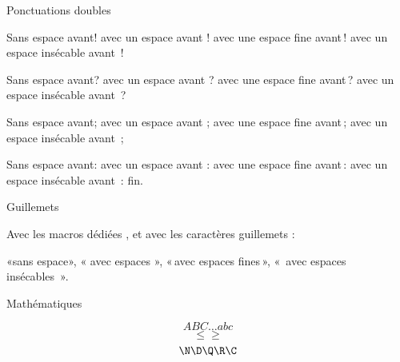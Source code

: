 \beginsection Ponctuations doubles

Sans espace avant!
avec un espace avant !
avec une espace fine avant !
avec un espace insécable avant !
\par
Sans espace avant?
avec un espace avant ?
avec une espace fine avant ?
avec un espace insécable avant ?
\par
Sans espace avant;
avec un espace avant ;
avec une espace fine avant ;
avec un espace insécable avant ;
\par
Sans espace avant:
avec un espace avant :
avec une espace fine avant :
avec un espace insécable avant :
fin.

\beginsection Guillemets

\og Avec les macros dédiées \fg, et avec les caractères guillemets :\par
«sans espace», « avec espaces », « avec espaces fines »,
« avec espaces insécables ».

\beginsection Mathématiques

$$ A B C \dots a b c $$
$$ \le \ge $$
$$ \N\D\Q\R\C $$


\bye
